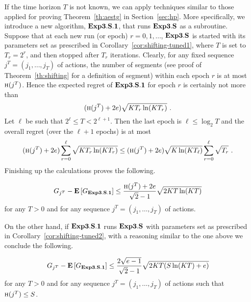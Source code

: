 \documentclass[12pt]{article}
\newcommand{\E}{\mbox{\rm\bf E}}
\newcommand{\Aests}{{\bf Exp3.S}}
\newcommand{\Aessg}{{\bf Exp3.S.1}}
\newcommand{\compl}{\mbox{\sc h}}
\begin{document}
\medskip\noindent
If the time horizon $T$ is not known, we can apply techniques similar to those
applied for proving Theorem~\ref{th:aestg} in Section~\ref{sec:hp}.
More specifically, we introduce a new algorithm, $\Aessg$, that runs $\Aests$ as
a subroutine.
Suppose that at each new run (or epoch) $r=0,1,\ldots$, $\Aests$ is started with 
its parameters set as prescribed in Corollary~\ref{cor:shifting-tuned1}, where
$T$ is set to $T_r=2^r$, and then stopped after $T_r$ iterations. Clearly, for
any fixed sequence $j^T=(j_1,\ldots,j_T)$ of actions, the number of segments
(see proof of Theorem~\ref{th:shifting} for a definition of segment) within each
epoch $r$ is at most $\compl(j^T)$. Hence the expected regret of $\Aessg$ for
epoch $r$ is certainly not more than
\[
        (\compl(j^T)+2e)\sqrt{KT_r\ln(KT_r)}~.
\]
Let $\ell$ be such that $2^{\ell} \leq T < 2^{\ell+1}$. Then the last epoch
is $\ell \leq \log_2 T$ and the overall regret (over the $\ell+1$ epochs) is
at most
\[
        (\compl(j^T)+2e)\sum_{r=0}^{\ell}\sqrt{KT_r\ln(KT_r)}
\leq
        (\compl(j^T)+2e)\sqrt{K\ln(KT_\ell)}\sum_{r=0}^{\ell}\sqrt{T_r}~.
\]
Finishing up the calculations proves the following.
\begin{cor}
\label{cor:shifting-guess1}
\[
    G_{j^T} - \E\left[G_{\Aessg}\right]
\leq
    \frac{\compl(j^T)+2e}{\sqrt{2}-1}\sqrt{2KT\ln(KT)}
\]
for any $T > 0$ and for any sequence $j^T=(j_1,\ldots,j_T)$ of actions.
\end{cor}
On the other hand, if $\Aessg$ runs $\Aests$ with parameters set as prescribed
in Corollary~\ref{cor:shifting-tuned2}, with a reasoning similar to the one above
we conclude the following.
\begin{cor}
\label{cor:shifting-guess2}
\[
    G_{j^T} - \E\left[G_{\Aessg}\right]
\leq
    \frac{2\sqrt{e-1}}{\sqrt{2}-1}\sqrt{2KT(S\ln(KT)+e)}
\]
for any $T > 0$ and for any sequence $j^T=(j_1,\ldots,j_T)$ of actions such that
$\compl(j^T) \leq S$.
\end{cor}

\newcommand{\bs}{\mbox{\boldmath$s$}}
\end{document}
